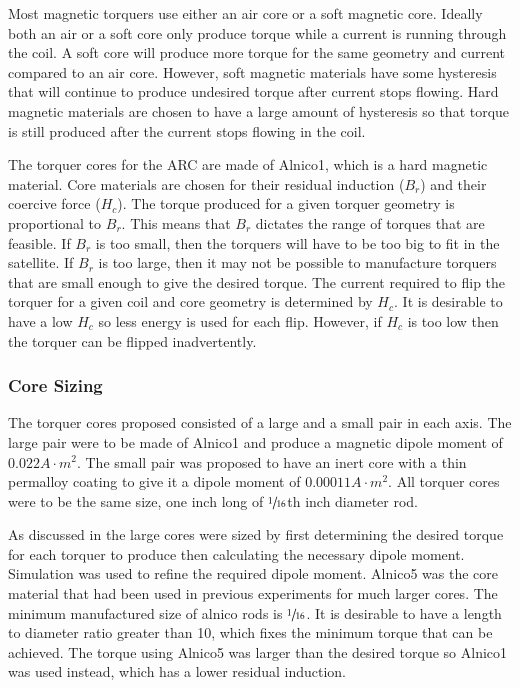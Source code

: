 Most magnetic torquers use either an air core or a soft magnetic core. Ideally both an air or a soft core only produce torque while a current is running through the coil. A soft core will produce more torque for the same geometry and current compared to an air core. However, soft magnetic materials have some hysteresis that will continue to produce undesired torque after current stops flowing. Hard magnetic materials are chosen to have a large amount of hysteresis so that torque is still produced after the current stops flowing in the coil.

The torquer cores for the \ac{ARC} are made of Alnico1, which is a hard magnetic material. Core materials are chosen for their residual induction ($B_r$) and their coercive force ($H_c$). The torque produced for a given torquer geometry is proportional to $B_r$. This means that $B_r$ dictates the range of torques that are feasible. If $B_r$ is too small, then the torquers will have to be too big to fit in the satellite. If $B_r$ is too large, then it may not be possible to manufacture torquers that are small enough to give the desired torque. The current required to flip the torquer for a given coil and core geometry is determined by $H_c$. It is desirable to have a low $H_c$ so less energy is used for each flip. However, if $H_c$ is too low then the torquer can be flipped inadvertently.

\subsubsection{Core Sizing}

The torquer cores proposed \cite{Mentch11} consisted of a large and a small pair in each axis. The large pair were to be made of Alnico1 and produce a magnetic dipole moment of $0.022 \unit{A \cdot m^2}$. The small pair was proposed to have an inert core with a thin permalloy coating to give it a dipole moment of $0.00011 \unit{A \cdot m^2}$. All torquer cores were to be the same size, one inch long of $\sfrac{1}{16}$th inch diameter rod.

As discussed in \cite{Mentch11} the large cores were sized by first determining the desired torque for each torquer to produce then calculating the necessary dipole moment. Simulation was used to refine the required dipole moment. Alnico5 was the core material that had been used in previous experiments for much larger cores\cite{Mentch11}. The minimum manufactured size of alnico rods is $\sfrac{1}{16}$. It is desirable to have a length to diameter ratio greater than 10, which fixes the minimum torque that can be achieved. The torque using Alnico5 was larger than the desired torque so Alnico1 was used instead, which has a lower residual induction. 

